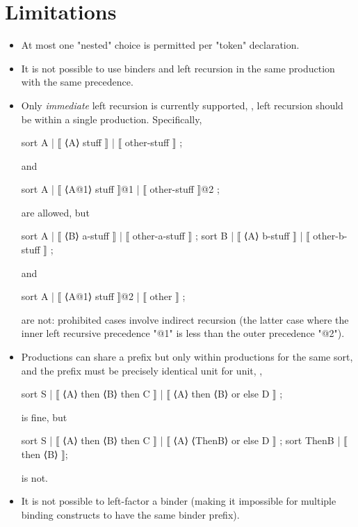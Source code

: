 \documentclass[12pt]{article} %
\begin{document}
\section{Limitations}\label{app:limits}

\begin{itemize}

\item At most one "nested" choice is permitted per "token" declaration.

\item It is not possible to use binders and left recursion in the same production with the same
  precedence.

\item Only \emph{immediate} left recursion is currently supported, \ie, left recursion should be
  within a single production. Specifically,
  \begin{hacs}
    sort A | ⟦ ⟨A⟩ stuff ⟧ | ⟦ other-stuff ⟧ ;
  \end{hacs}
  and 
  \begin{hacs}
    sort A | ⟦ ⟨A@1⟩ stuff ⟧@1 | ⟦ other-stuff ⟧@2 ;
  \end{hacs}
  are allowed, but
  \begin{hacs}
    sort A | ⟦ ⟨B⟩ a-stuff ⟧ | ⟦ other-a-stuff ⟧ ;
    sort B | ⟦ ⟨A⟩ b-stuff ⟧ | ⟦ other-b-stuff ⟧ ;
  \end{hacs}
  and 
  \begin{hacs}
    sort A  | ⟦ ⟨A@1⟩ stuff ⟧@2 | ⟦ other ⟧ ;
  \end{hacs}
  are not: prohibited cases involve indirect recursion (the latter case where the inner left
  recursive precedence "@1" is less than the outer precedence "@2").

\item Productions can share a prefix but only within productions for the same sort, and the prefix
  must be precisely identical unit for unit, \ie,
  \begin{hacs}
    sort S | ⟦ ⟨A⟩ then ⟨B⟩ then C ⟧
           | ⟦ ⟨A⟩ then ⟨B⟩ or else D ⟧ ;
  \end{hacs}
  is fine, but
  \begin{hacs}
    sort S | ⟦ ⟨A⟩ then ⟨B⟩ then C ⟧
           | ⟦ ⟨A⟩ ⟨ThenB⟩ or else D ⟧ ;
    sort ThenB | ⟦ then ⟨B⟩ ⟧;
  \end{hacs}
  is not.

\item It is not possible to left-factor a binder (making it impossible for multiple binding
  constructs to have the same binder prefix).


\end{itemize}
\end{document}
